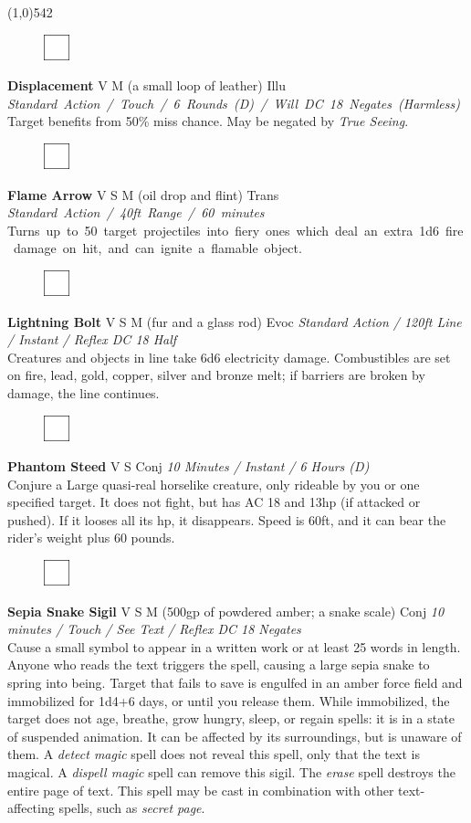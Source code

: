\documentclass[letterpaper]{article}
\newcommand{\fullline}{\noindent\line(1,0){542} \\}
\newcommand{\spell}[7]{
\begin{figure}
\vspace{-13pt}
\ifstrequal{#2}{Full}{  \includegraphics[width=2em]{Checkbox-Full}}{
\ifstrequal{#2}{Scroll}{\includegraphics[width=2em]{Checkbox-S}}{
                        \includegraphics[width=2em]{Checkbox}}}
\ifstrequal{#7}{}{\vspace{-1em}}{\vspace{#7}}
\end{figure}
\noindent \textbf{#1} #3 {
    \ifstrequal{#4}{Conj}{\color{Plum}Conj}{%
    \ifstrequal{#4}{Divin}{\color{YellowOrange}Divin}{%
    \ifstrequal{#4}{Ench}{\color{VioletRed}Ench}{%
    \ifstrequal{#4}{Trans}{\color{LimeGreen}Trans}{%
    \ifstrequal{#4}{Evoc}{\color{RedOrange}Evoc}{%
    \ifstrequal{#4}{Illu}{\color{ProcessBlue}Illu}{%
    \ifstrequal{#4}{Abjur}{\color{CadetBlue}Abjur}{%
    \ifstrequal{#4}{Necro}{\color{Red}Necro}{%
}}}}}}}}}
{\footnotesize \emph{#5}} \\
#6
}
\begin{document}
\fullline
\vspace{-1.25em}

\spell{Displacement}{}{V M (a small loop of leather)}{Illu}{\mbox{Standard Action / Touch / 6 Rounds (D) / Will DC 18 Negates (Harmless)}}{%
Target benefits from 50\% miss chance. May be negated by \emph{True Seeing}.}{}\\[-1em] %

\spell{Flame Arrow}{}{V S M (oil drop and flint)}{Trans}{\mbox{Standard Action / 40ft Range / 60 minutes}}{%
\mbox{Turns up to 50 target projectiles into fiery ones which deal an extra 1d6 fire damage on hit, and can ignite a flamable object.}}{}\\[-1em] %

\spell{Lightning Bolt}{}{V S M (fur and a glass rod)}{Evoc}{Standard Action / 120ft Line / Instant / Reflex DC 18 Half}{%
Creatures and objects in line take 6d6 electricity damage. Combustibles are set on fire, lead, gold, copper, silver and bronze melt; if barriers are broken by damage, the line continues.}{} %

\spell{Phantom Steed}{}{V S}{Conj}{10 Minutes / Instant / 6 Hours (D)}{%
Conjure a Large quasi-real horselike creature, only rideable by you or one specified target. It does not fight, but has AC 18 and 13hp (if attacked or pushed).  If it looses all its hp, it disappears.  Speed is 60ft, and it can bear the rider's weight plus 60 pounds.}{1em}\\[-1em] %

\spell{Sepia Snake Sigil}{}{V S M (500gp of powdered amber; a snake scale)}{Conj}{\emph{10 minutes / Touch / See Text / Reflex DC 18 Negates}}{%
Cause a small symbol to appear in a written work or at least 25 words in length.  Anyone who reads the text triggers the spell, causing a large sepia snake to spring into being.  Target that fails to save is engulfed in an amber force field and immobilized for 1d4+6 days, or until you release them.  While immobilized, the target does not age, breathe, grow hungry, sleep, or regain spells: it is in a state of suspended animation.  It can be affected by its surroundings, but is unaware of them.  A \emph{detect magic} spell does not reveal this spell, only that the text is magical.  A \emph{dispell magic} spell can remove this sigil.  The \emph{erase} spell destroys the entire page of text.  This spell may be cast in combination with other text-affecting spells, such as \emph{secret page}.}{5em}\\[-1em] %
\end{document}
